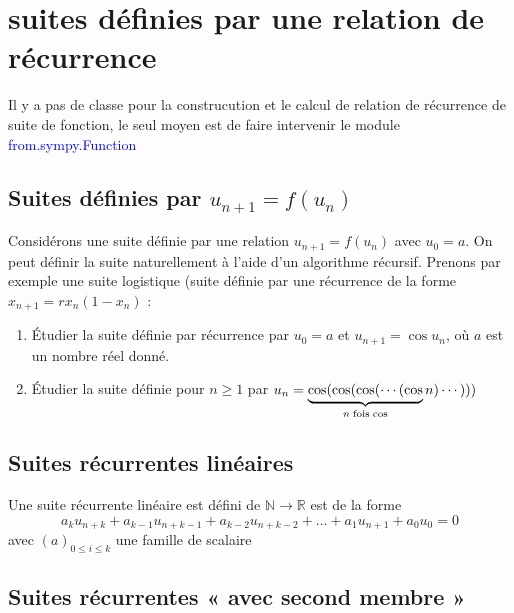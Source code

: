 \chapter{suites définies par une relation de récurrence}
Il y a pas de classe pour la construcution et le calcul de relation de récurrence de suite de fonction, le seul moyen est
de faire intervenir le module \textcolor{blue}{from.sympy.Function}
	\section{Suites définies par $u_{n+1} = f\left(u_{n} \right)$}
 \begin{definition}
 Considérons une suite définie par une relation $u_{n+1} = f\left(u_{n}\right)$ avec $u_{0} = a$. On peut définir la suite naturellement à l’aide d’un algorithme récursif. Prenons par exemple une suite logistique (suite définie par une récurrence
de la forme $x_{n+1} = rx_{n}\left(1 - x_{n} \right)$ :
 \end{definition}
 
 \begin{exercise}
  \begin{enumerate}
   \item Étudier la suite définie par récurrence par $u_0=a$ et $ u_{n+1}= \cos u_n$, où $a$ est un nombre réel donné.
   \item Étudier la suite définie pour $ n\geqslant 1$ par $ u_n=\underbrace{\cos(\cos(\cos(\cdots(\cos}
_{n \; \rm fois\; cos} n)\cdots)))$
  \end{enumerate}
 \end{exercise}
	\section{Suites récurrentes linéaires}
  \begin{definition}
  Une suite récurrente linéaire est défini de $\mathbb{N} \longrightarrow \mathbb{R}$ est de la forme
  \[
  a_{k}u_{n+k}+ a_{k-1}u_{n+k-1} + a_{k-2}u_{n+k-2} + ...+a_{1}u_{n+1}+ a_{0}u_{0} = 0
  \]
  avec $\left(a\right)_{0\leq i \leq k}$ une famille de scalaire
  \begin{example}
  
  \end{example}
  \end{definition}
	\section{Suites récurrentes « avec second membre »}